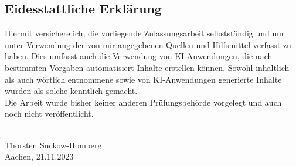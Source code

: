 \thispagestyle{empty}
\pagebreak
\hspace{0pt}
\vfill

\subsection*{Eidesstattliche Erklärung}
Hiermit versichere ich, die vorliegende Zulassungsarbeit selbstständig und nur unter
Verwendung der von mir angegebenen Quellen und Hilfsmittel verfasst zu haben.
Dies umfasst auch die Verwendung von KI-Anwendungen, die nach bestimmten Vorgaben
automatisiert Inhalte erstellen können.
Sowohl inhaltlich als auch wörtlich entnommene sowie
von KI-Anwendungen generierte Inhalte wurden als solche kenntlich gemacht.\\

Die Arbeit wurde bisher keiner anderen Prüfungsbehörde vorgelegt und auch noch nicht veröffentlicht.\\


\begin{center}
\underline{\hspace{6cm}}\\
Thorsten Suckow-Homberg \\Aachen, 21.11.2023
\end{center}


\vfill
\hspace{0pt}
\pagebreak
